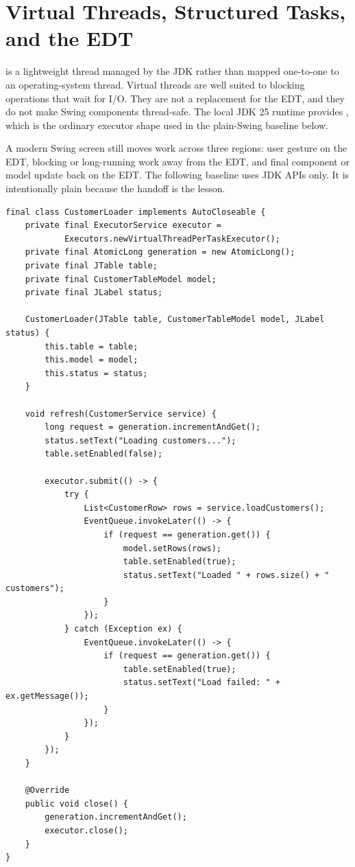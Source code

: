 \section{Virtual Threads, Structured Tasks, and the EDT}

 is a lightweight thread managed by the JDK rather than mapped one-to-one to an operating-system thread. Virtual threads are well suited to blocking operations that wait for I/O. They are not a replacement for the EDT, and they do not make Swing components thread-safe. The local JDK 25 runtime provides , which is the ordinary executor shape used in the plain-Swing baseline below.

A modern Swing screen still moves work across three regions: user gesture on the EDT, blocking or long-running work away from the EDT, and final component or model update back on the EDT. The following baseline uses JDK APIs only. It is intentionally plain because the handoff is the lesson.

\begin{lstlisting}[caption={Plain Swing with a virtual-thread executor and explicit EDT return.}]
final class CustomerLoader implements AutoCloseable {
    private final ExecutorService executor =
            Executors.newVirtualThreadPerTaskExecutor();
    private final AtomicLong generation = new AtomicLong();
    private final JTable table;
    private final CustomerTableModel model;
    private final JLabel status;

    CustomerLoader(JTable table, CustomerTableModel model, JLabel status) {
        this.table = table;
        this.model = model;
        this.status = status;
    }

    void refresh(CustomerService service) {
        long request = generation.incrementAndGet();
        status.setText("Loading customers...");
        table.setEnabled(false);

        executor.submit(() -> {
            try {
                List<CustomerRow> rows = service.loadCustomers();
                EventQueue.invokeLater(() -> {
                    if (request == generation.get()) {
                        model.setRows(rows);
                        table.setEnabled(true);
                        status.setText("Loaded " + rows.size() + " customers");
                    }
                });
            } catch (Exception ex) {
                EventQueue.invokeLater(() -> {
                    if (request == generation.get()) {
                        table.setEnabled(true);
                        status.setText("Load failed: " + ex.getMessage());
                    }
                });
            }
        });
    }

    @Override
    public void close() {
        generation.incrementAndGet();
        executor.close();
    }
}
\end{lstlisting}

